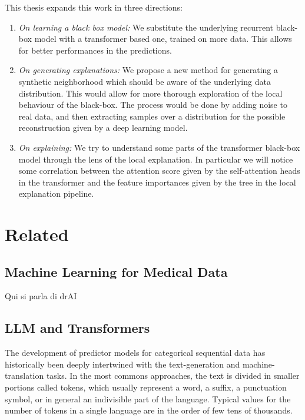 \documentclass[]{marticle}
\begin{document}
This thesis expands this work in three directions:
\begin{enumerate}
\item \emph{On learning a black box model:} We substitute the underlying recurrent black-box model
with a transformer based one, trained on more data. This allows for better performances in the
predictions.

\item \emph{On generating explanations:}  We propose a new method for generating a synthetic
neighborhood which should be aware of the underlying data distribution. This would allow for more
thorough exploration of the local behaviour of the black-box. The process would be done by adding
noise to real data, and then extracting samples over a distribution for the possible reconstruction
given by a deep learning model.

\item \emph{On explaining:} We try to understand some parts of the transformer black-box model
through the lens of the local explanation. In particular we will notice some correlation between the
attention score given by the self-attention heads in the transformer and the feature importances
given by the tree in the local explanation pipeline.
\end{enumerate}

\section{Related}

\subsection{Machine Learning for Medical Data}

Qui si parla di drAI

\subsection{LLM and Transformers}

The development of predictor models for categorical sequential data has historically been deeply
intertwined with the text-generation and machine-translation tasks. In the most commons approaches,
the text is divided in smaller portions called tokens, which usually represent a word, a suffix, a
punctuation symbol, or in general an indivisible part of the language. Typical values for the number
of tokens in a single language are in the order of few tens of thousands.
\end{document}
